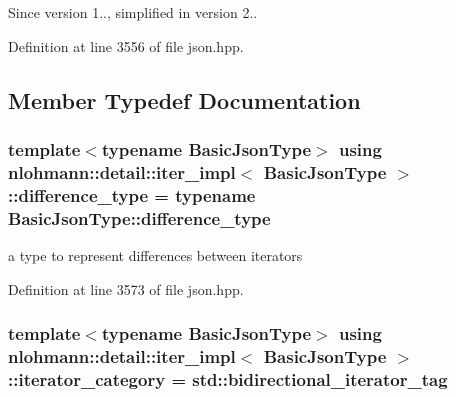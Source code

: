 \begin{DoxySince}{Since}
version 1.., simplified in version 2.. 
\end{DoxySince}


Definition at line 3556 of file json.\+hpp.



\subsection{Member Typedef Documentation}
\subsubsection[{\texorpdfstring{difference\+\_\+type}{difference_type}}]{\setlength{\rightskip}{0pt plus 5cm}template$<$typename Basic\+Json\+Type$>$ using {\bf nlohmann\+::detail\+::iter\+\_\+impl}$<$ Basic\+Json\+Type $>$\+::{\bf difference\+\_\+type} =  typename Basic\+Json\+Type\+::difference\+\_\+type}\hypertarget{classnlohmann_1_1detail_1_1iter__impl_a2f7ea9f7022850809c60fc3263775840}{}\label{classnlohmann_1_1detail_1_1iter__impl_a2f7ea9f7022850809c60fc3263775840}


a type to represent differences between iterators 



Definition at line 3573 of file json.\+hpp.

\subsubsection[{\texorpdfstring{iterator\+\_\+category}{iterator_category}}]{\setlength{\rightskip}{0pt plus 5cm}template$<$typename Basic\+Json\+Type$>$ using {\bf nlohmann\+::detail\+::iter\+\_\+impl}$<$ Basic\+Json\+Type $>$\+::{\bf iterator\+\_\+category} =  std\+::bidirectional\+\_\+iterator\+\_\+tag}\hypertarget{classnlohmann_1_1detail_1_1iter__impl_ad9e091f5c70b34b5b1abc1ab15fd9106}{}\label{classnlohmann_1_1detail_1_1iter__impl_ad9e091f5c70b34b5b1abc1ab15fd9106}


